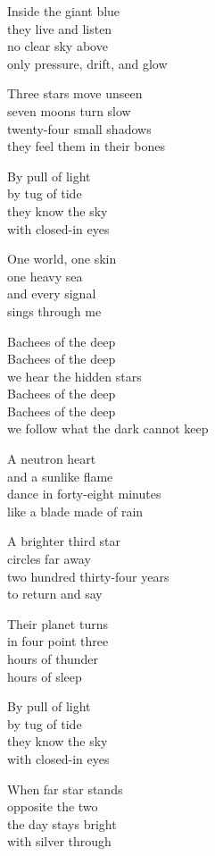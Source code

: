 \begin{lyrics}
Inside the giant blue\\
they live and listen\\
no clear sky above\\
only pressure, drift, and glow

Three stars move unseen\\
seven moons turn slow\\
twenty-four small shadows\\
they feel them in their bones

By pull of light\\
by tug of tide\\
they know the sky\\
with closed-in eyes

One world, one skin\\
one heavy sea\\
and every signal\\
sings through me

Bachees of the deep\\
Bachees of the deep\\
we hear the hidden stars\\
Bachees of the deep\\
Bachees of the deep\\
we follow what the dark cannot keep

A neutron heart\\
and a sunlike flame\\
dance in forty-eight minutes\\
like a blade made of rain

A brighter third star\\
circles far away\\
two hundred thirty-four years\\
to return and say

Their planet turns\\
in four point three\\
hours of thunder\\
hours of sleep

By pull of light\\
by tug of tide\\
they know the sky\\
with closed-in eyes

When far star stands\\
opposite the two\\
the day stays bright\\
with silver through


\end{lyrics}

